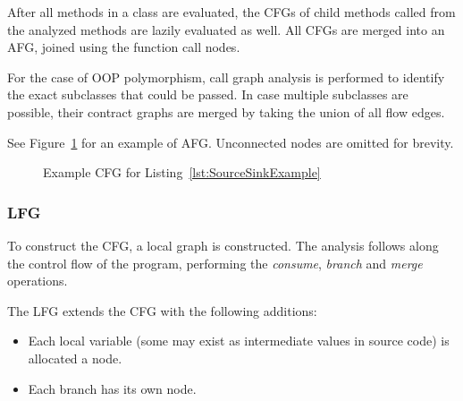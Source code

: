 After all methods in a class are evaluated,
the CFGs of child methods called from the analyzed methods
are lazily evaluated as well.
All CFGs are merged into an \ac{AFG},
joined using the function call nodes.

For the case of \ac{OOP} polymorphism,
call graph analysis is performed to identify
the exact subclasses that could be passed.
In case multiple subclasses are possible,
their contract graphs are merged by taking the union of all flow edges.

See Figure~\ref{fig:SourceSinkContract} for an example of \ac{AFG}.
Unconnected nodes are omitted for brevity.

\begin{figure}
	\caption{Example \ac{CFG} for Listing~\ref{lst:SourceSinkExample}}
	\begin{center}
	\end{center}
	\label{fig:SourceSinkContract}
\end{figure}

\subsubsection{\acf{LFG}}
To construct the \ac{CFG},
a local graph is constructed.
The analysis follows along the control flow of the program,
performing the \emph{consume}, \emph{branch} and \emph{merge} operations.

The \ac{LFG} extends the \ac{CFG} with the following additions:
\begin{itemize}
	\item Each local variable (some may exist as intermediate values in source code)
		is allocated a node.
	\item Each branch has its own  node.
\end{itemize}

